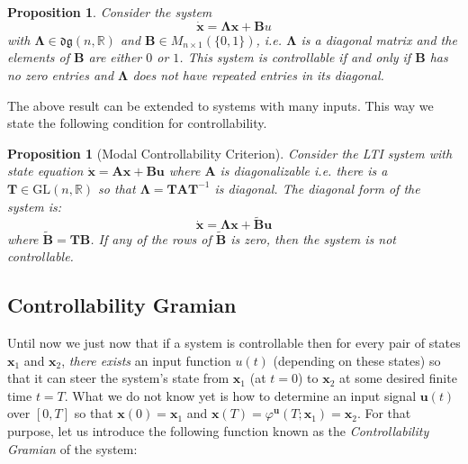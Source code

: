 \documentclass[a4paper,10pt,oneside]{book}
\newtheorem{proposition}[theorem]{Proposition}
\begin{document}
\begin{proposition}
Consider the system
\begin{equation}
 \dot{\mathbf{x}}=\mathbf{\Lambda x}+\mathbf{B}u
\end{equation}
 with $\mathbf{\Lambda}\in \mathfrak{dg}(n,\mathbb{R})$ and $\mathbf{B}\in M_{n\times 1}(\{0,1\})$, i.e. $\mathbf{\Lambda}$ is a diagonal matrix and the elements of $\mathbf{B}$ are either $0$ or $1$. This system is controllable if and only if $\mathbf{B}$ has no zero entries and $\mathbf{\Lambda}$ does not have repeated entries in its diagonal.
\end{proposition}

The above result can be extended to systems with many inputs. This way we state the following condition for controllability.
\begin{proposition}[Modal Controllability Criterion]
 Consider the LTI system with state equation $\dot{\mathbf{x}}=\mathbf{Ax}+\mathbf{Bu}$ where $\mathbf{A}$ is diagonalizable i.e. there is a $\mathbf{T}\in\text{GL}(n,\mathbb{R})$ so that $\mathbf{\Lambda}=\mathbf{TAT}^{-1}$ is diagonal. The diagonal form of the system is:
\begin{equation}
 \dot{\mathbf{x}}=\mathbf{\Lambda x}+\tilde{\mathbf{B}}\mathbf{u}
\end{equation}
where $\tilde{\mathbf{B}}=\mathbf{TB}$. If any of the rows of $\tilde{\mathbf{B}}$ is zero, then the system is not controllable.
\end{proposition}


\subsection{Controllability Gramian}
Until now we just now that if a system is controllable then for every pair of states $\mathbf{x}_1$ and $\mathbf{x}_2$, \emph{there exists} an input function $u(t)$ (depending on these states) so that it can steer the system's state from $\mathbf{x}_1$ (at $t=0$) to $\mathbf{x}_2$ at some desired finite time $t=T$. What we do not know yet is how to determine an input signal $\mathbf{u}(t)$ over $[0,T]$ so that $\mathbf{x}(0)=\mathbf{x}_1$ and $\mathbf{x}(T)=\varphi^{\mathbf{u}}(T;\mathbf{x}_1)=\mathbf{x}_2$. For that purpose, let us introduce the following function known as the \emph{Controllability Gramian} of the system:
\end{document}
